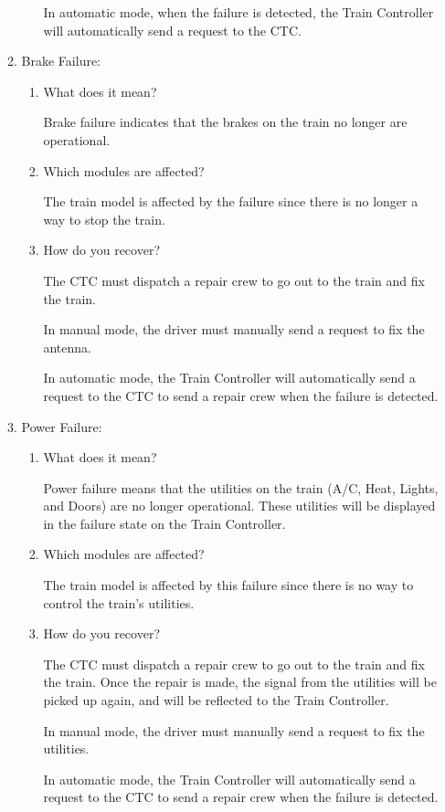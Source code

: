 \documentclass[11pt]{article}
\begin{document}
\begin{enumerate}
\begin{enumerate}
\begin{enumerate}
In automatic mode, when the failure is detected, the Train Controller will automatically send a request to the CTC.
\end{enumerate}

\item Brake Failure:
\label{sec-3-1-5-9-2}
\begin{enumerate}
\item What does it mean?
\label{sec-3-1-5-9-2-1}

Brake failure indicates that the brakes on the train no longer are operational. 
\item Which modules are affected?
\label{sec-3-1-5-9-2-2}

The train model is affected by the failure since there is no longer a way to stop the train.
\item How do you recover?
\label{sec-3-1-5-9-2-3}

The CTC must dispatch a repair crew to go out to the train and fix the train. 

In manual mode, the driver must manually send a request to fix the antenna. 

In automatic mode, the Train Controller will automatically send a request to the CTC to send a repair crew when the failure is detected.
\end{enumerate}

\item Power Failure:
\label{sec-3-1-5-9-3}
\begin{enumerate}
\item What does it mean?
\label{sec-3-1-5-9-3-1}

Power failure means that the utilities on the train (A/C, Heat, Lights, and Doors) are no longer operational. These utilities will be displayed in the failure state on the Train Controller. 
\item Which modules are affected?
\label{sec-3-1-5-9-3-2}

The train model is affected by this failure since there is no way to control the train's utilities. 
\item How do you recover?
\label{sec-3-1-5-9-3-3}

The CTC must dispatch a repair crew to go out to the train and fix the train. 
Once the repair is made, the signal from the utilities will be picked up again, and will be reflected to the Train Controller.

In manual mode, the driver must manually send a request to fix the utilities. 

In automatic mode, the Train Controller will automatically send a request to the CTC to send a repair crew when the failure is detected.
\end{enumerate}
\end{enumerate}
\end{enumerate}
\end{document}
